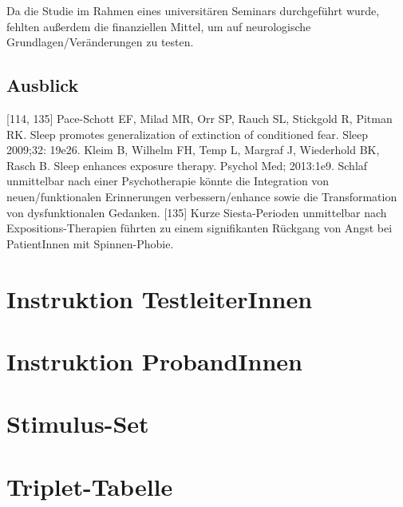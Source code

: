 Da die Studie im Rahmen eines universitären Seminars durchgeführt wurde, fehlten außerdem die finanziellen Mittel, um auf neurologische Grundlagen/Veränderungen zu testen.


\subsection{Ausblick}
[114, 135]
Pace-Schott EF, Milad MR, Orr SP, Rauch SL, Stickgold R, Pitman RK. Sleep promotes generalization of extinction of conditioned fear. Sleep 2009;32: 19e26.
Kleim B, Wilhelm FH, Temp L, Margraf J, Wiederhold BK, Rasch B. Sleep enhances exposure therapy. Psychol Med; 2013:1e9.
Schlaf unmittelbar nach einer Psychotherapie könnte die Integration von neuen/funktionalen Erinnerungen verbessern/enhance sowie die Transformation von dysfunktionalen Gedanken.
[135] Kurze Siesta-Perioden unmittelbar nach Expositions-Therapien führten zu einem signifikanten Rückgang von Angst bei PatientInnen mit Spinnen-Phobie.


\cite{Test}

\newpage



\clearpage
\appendix
{} %
\renewcommand*{\thesection}{\Alph{section}}

\section{Instruktion TestleiterInnen}

\newpage

\section{Instruktion ProbandInnen}

\newpage

\section{Stimulus-Set}

\newpage

\section{Triplet-Tabelle}

\newpage
\clearpage


